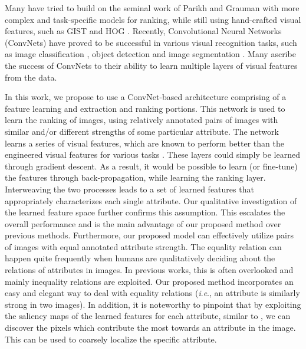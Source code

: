 \documentclass[runningheads]{llncs}
\newcommand{\ie}{\textit{i}.\textit{e}.}
\begin{document}
Many have tried to build on the seminal work of Parikh and Grauman \cite{parikh2011} with more complex and task-specific models for ranking, while still using hand-crafted visual features, such as GIST \cite{Aude01} and HOG \cite{hog}. Recently, Convolutional Neural Networks (ConvNets) have proved to be successful in various visual recognition tasks, such as image classification \cite{Krizhevsky2012ImageNetCW}, object detection \cite{RCNN} and image segmentation \cite{fullyconv}. Many ascribe the success of ConvNets to their ability to learn multiple layers of visual features from the data. 

In this work, we propose to use a ConvNet-based architecture comprising of a feature learning and extraction and ranking portions. This network is used to learn the ranking of images, using relatively annotated pairs of images with similar and/or different strengths of some particular attribute. The network learns a series of visual features, which are known %
 to perform better than the engineered visual features for various tasks \cite{offtheshelf}. These layers could simply be learned through gradient descent. As a result, it would be possible to learn (or fine-tune) the features through back-propagation, while learning the ranking layer.
Interweaving the two processes leads to a set of learned features that appropriately characterizes each single attribute. Our qualitative investigation of the learned feature space further confirms this assumption. This escalates the overall performance and is the main advantage of our proposed method over previous methods. 
Furthermore, our proposed model can effectively utilize pairs of images with equal annotated attribute strength. The equality relation can happen quite frequently when humans are qualitatively deciding about the relations of attributes in images. In previous works, this is often overlooked and mainly inequality relations are exploited. Our proposed method incorporates an easy and elegant way to deal with equality relations (\ie, an attribute is similarly strong in two images). 
In addition, it is noteworthy to pinpoint that by exploiting the saliency maps of the learned features for each attribute, similar to \cite{saliency}, we can discover the pixels which contribute the most towards an attribute in the image. This can be used to coarsely localize the specific attribute.
\end{document}
